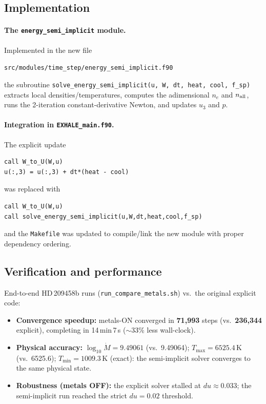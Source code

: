 \documentclass[english,a4paper]{my_memo}
\begin{document}
\subsection{Implementation}
\paragraph{The \texttt{energy\_semi\_implicit} module.} Implemented in the new file
\begin{center}\texttt{src/modules/time\_step/energy\_semi\_implicit.f90}\end{center}
the subroutine \texttt{solve\_energy\_semi\_implicit(u, W, dt, heat, cool, f\_sp)}
extracts local densities/temperatures, computes the adimensional $n_e$ and
$n_{\rm all}$, runs the 2-iteration constant-derivative Newton, and updates $u_3$
and $p$.

\paragraph{Integration in \texttt{EXHALE\_main.f90}.} The explicit update
\begin{lstlisting}
call W_to_U(W,u)
u(:,3) = u(:,3) + dt*(heat - cool)
\end{lstlisting}
was replaced with
\begin{lstlisting}
call W_to_U(W,u)
call solve_energy_semi_implicit(u,W,dt,heat,cool,f_sp)
\end{lstlisting}
and the \texttt{Makefile} was updated to compile/link the new module with proper
dependency ordering.

\subsection{Verification and performance}
End-to-end HD\,209458b runs (\texttt{run\_compare\_metals.sh}) vs.\ the original
explicit code:
\begin{itemize}
  \item \textbf{Convergence speedup:} metals-ON converged in \textbf{71{,}993}
    steps (vs.\ \textbf{236{,}344} explicit), completing in 14\,min\,7\,s
    ($\sim$33\% less wall-clock).
  \item \textbf{Physical accuracy:} $\log_{10}\dot M = 9.49061$ (vs.\ 9.49064);
    $T_{\max}=6525.4$\,K (vs.\ 6525.6); $T_{\min}=1009.3$\,K (exact): the
    semi-implicit solver converges to the same physical state.
  \item \textbf{Robustness (metals OFF):} the explicit solver stalled at
    $du\approx0.033$; the semi-implicit run reached the strict $du=0.02$ threshold.
\end{itemize}
\end{document}
